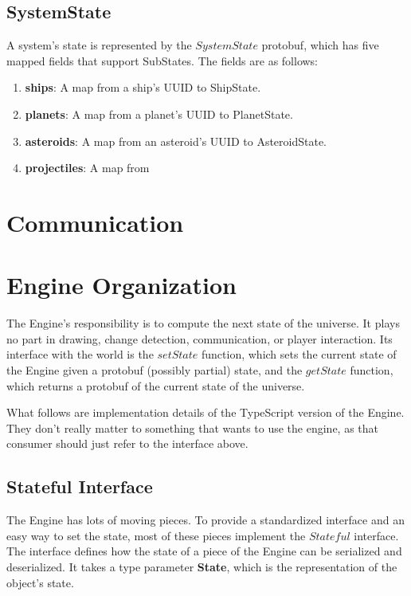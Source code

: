 \documentclass{article}
\begin{document}
\subsection{SystemState}
A system's state is represented by the $SystemState$ protobuf, which has five mapped fields that support SubStates. The fields are as follows:
\begin{enumerate}
\item[] \textbf{ships}: A map from a ship's UUID to ShipState.
\item[] \textbf{planets}: A map from a planet's UUID to PlanetState.
\item[] \textbf{asteroids}: A map from an asteroid's UUID to AsteroidState.
\item[] \textbf{projectiles}: A map from 


\end{enumerate}


\section{Communication} \label{communication}


\section{Engine Organization}
The Engine's responsibility is to compute the next state of the universe. It plays no part in drawing, change detection, communication, or player interaction. Its interface with the world is the $setState$ function, which sets the current state of the Engine given a protobuf (possibly partial) state, and the $getState$ function, which returns a protobuf of the current state of the universe.

What follows are implementation details of the TypeScript version of the Engine. They don't really matter to something that wants to use the engine, as that consumer should just refer to the interface above.

\subsection{Stateful Interface}
The Engine has lots of moving pieces. To provide a standardized interface and an easy way to set the state, most of these pieces implement the $Stateful$ interface. The interface defines how the state of a piece of the Engine can be serialized and deserialized. It takes a type parameter \textbf{State}, which is the representation of the object's state.
\end{document}
